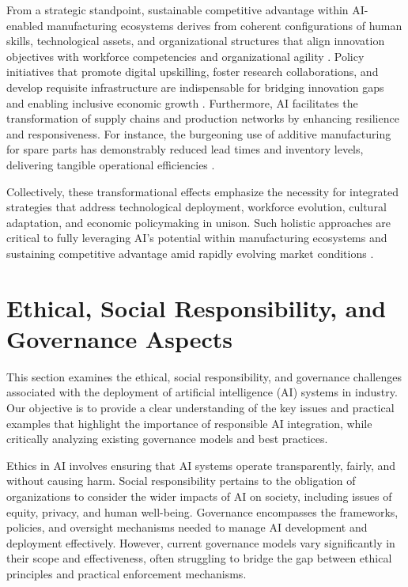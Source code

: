 \documentclass[sigconf]{acmart}
\begin{document}
From a strategic standpoint, sustainable competitive advantage within AI-enabled manufacturing ecosystems derives from coherent configurations of human skills, technological assets, and organizational structures that align innovation objectives with workforce competencies and organizational agility \cite{ref36}. Policy initiatives that promote digital upskilling, foster research collaborations, and develop requisite infrastructure are indispensable for bridging innovation gaps and enabling inclusive economic growth \cite{ref38}. Furthermore, AI facilitates the transformation of supply chains and production networks by enhancing resilience and responsiveness. For instance, the burgeoning use of additive manufacturing for spare parts has demonstrably reduced lead times and inventory levels, delivering tangible operational efficiencies \cite{ref9}.

Collectively, these transformational effects emphasize the necessity for integrated strategies that address technological deployment, workforce evolution, cultural adaptation, and economic policymaking in unison. Such holistic approaches are critical to fully leveraging AI’s potential within manufacturing ecosystems and sustaining competitive advantage amid rapidly evolving market conditions \cite{ref19,ref36,ref38}.

\section{Ethical, Social Responsibility, and Governance Aspects}

This section examines the ethical, social responsibility, and governance challenges associated with the deployment of artificial intelligence (AI) systems in industry. Our objective is to provide a clear understanding of the key issues and practical examples that highlight the importance of responsible AI integration, while critically analyzing existing governance models and best practices.

Ethics in AI involves ensuring that AI systems operate transparently, fairly, and without causing harm. Social responsibility pertains to the obligation of organizations to consider the wider impacts of AI on society, including issues of equity, privacy, and human well-being. Governance encompasses the frameworks, policies, and oversight mechanisms needed to manage AI development and deployment effectively. However, current governance models vary significantly in their scope and effectiveness, often struggling to bridge the gap between ethical principles and practical enforcement mechanisms.
\end{document}
